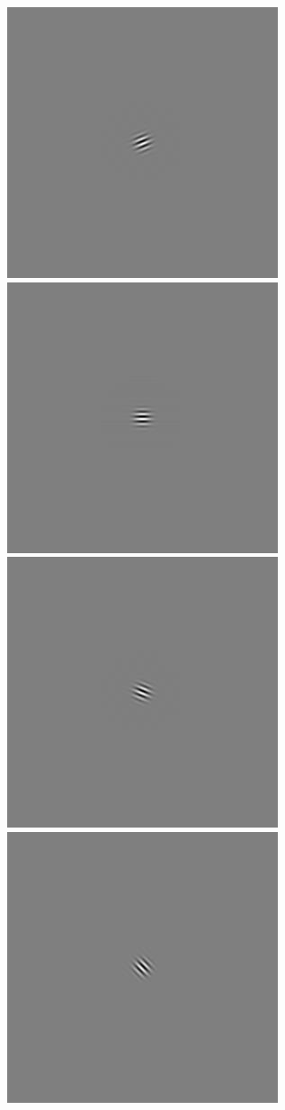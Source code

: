 \begin{figure}
\begin{center}
 \includegraphics[scale=0.1]{ch4/figures/iGabor0_3.jpg}
 \includegraphics[scale=0.1]{ch4/figures/iGabor0_4.jpg}
 \includegraphics[scale=0.1]{ch4/figures/iGabor0_5.jpg}
 \includegraphics[scale=0.1]{ch4/figures/iGabor0_6.jpg}

\end{center}
\end{figure}
